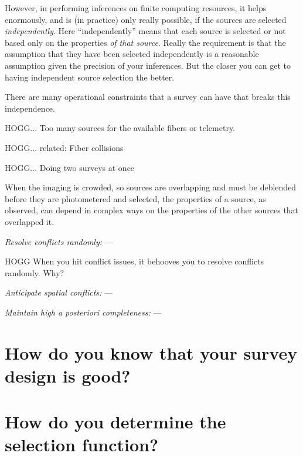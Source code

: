\documentclass[modern]{aastex62}
\renewcommand{\paragraph}[1]{\medskip\noindent\textit{#1} ---}
\begin{document}
However, in performing inferences on finite computing resources,
it helps enormously, and is (in practice) only really possible, if the 
sources are selected \emph{independently}.
Here ``independently'' means that each source is selected or not based
only on the properties \emph{of that source}.
Really the requirement is that the assumption that they have been
selected independently is a reasonable assumption given the precision
of your inferences.
But the closer you can get to having independent source selection the
better.

There are many operational constraints that a survey can have that
breaks this independence.

HOGG... Too many sources for the available fibers or telemetry.

HOGG... related: Fiber collisions

HOGG... Doing two surveys at once

When the imaging is crowded, so sources are overlapping and must be
deblended before they are photometered and selected, the properties of
a source, as observed, can depend in complex ways on the properties of
the other sources that overlapped it.

\paragraph{Resolve conflicts randomly:}

HOGG When you hit conflict issues, it behooves you to resolve conflicts randomly. Why?

\paragraph{Anticipate spatial conflicts:}

\paragraph{Maintain high a posteriori completeness:}

\section{How do you know that your survey design is good?}\label{sec:verify}

\section{How do you determine the selection function?}\label{sec:estimate}
\end{document}
